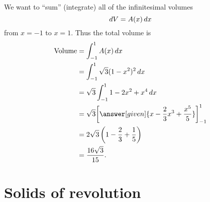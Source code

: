 \documentclass{ximera}
\begin{document}
\begin{example}
\begin{explanation}
We want to ``sum'' (integrate) all of the infinitesimal volumes
\[
\mathop{}\!d V = A(x) \mathop{}\!d x
\]
from $x=-1$ to $x=1$.  Thus the total volume is
\begin{align*}
  \text{Volume} &= \int_{-1}^1 A(x) \d x  \\
  &= \int_{-1}^1 \sqrt{3} (1-x^2)^2 \d x\\
  &=\sqrt{3} \int_{-1}^1 1-2x^2+x^4 \d x \\
  &=\sqrt{3} \eval{\answer[given]{x-\frac{2}{3}x^3+\frac{x^5}{5}}}_{-1}^1\\
  &=2\sqrt{3}\left(1-\frac{2}{3}+\frac{1}{5}\right)\\
  &=\frac{16\sqrt{3}}{15}.
\end{align*}
\end{explanation}
\end{example}



\section{Solids of revolution}

\end{document}
